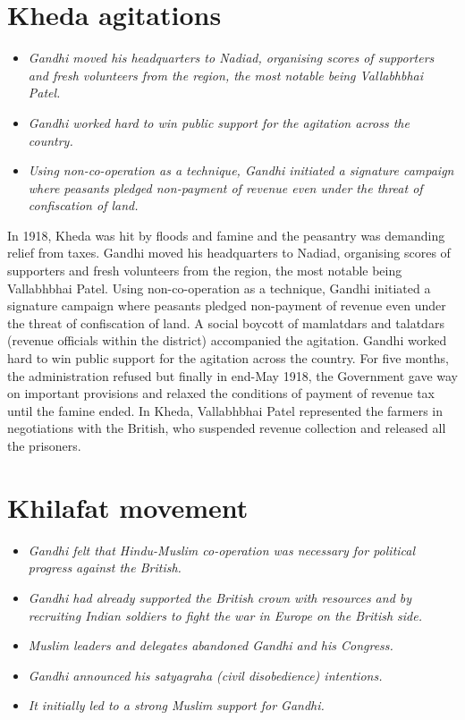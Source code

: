 \section{Kheda agitations}\label{kheda-agitations}

\begin{itemize}
\item
  \emph{Gandhi moved his headquarters to Nadiad, organising scores of
  supporters and fresh volunteers from the region, the most notable
  being Vallabhbhai Patel.}
\item
  \emph{Gandhi worked hard to win public support for the agitation
  across the country.}
\item
  \emph{Using non-co-operation as a technique, Gandhi initiated a
  signature campaign where peasants pledged non-payment of revenue even
  under the threat of confiscation of land.}
\end{itemize}

In 1918, Kheda was hit by floods and famine and the peasantry was
demanding relief from taxes. Gandhi moved his headquarters to Nadiad,
organising scores of supporters and fresh volunteers from the region,
the most notable being Vallabhbhai Patel. Using non-co-operation as a
technique, Gandhi initiated a signature campaign where peasants pledged
non-payment of revenue even under the threat of confiscation of land. A
social boycott of mamlatdars and talatdars (revenue officials within the
district) accompanied the agitation. Gandhi worked hard to win public
support for the agitation across the country. For five months, the
administration refused but finally in end-May 1918, the Government gave
way on important provisions and relaxed the conditions of payment of
revenue tax until the famine ended. In Kheda, Vallabhbhai Patel
represented the farmers in negotiations with the British, who suspended
revenue collection and released all the prisoners.

\section{Khilafat movement}\label{khilafat-movement}

\begin{itemize}
\item
  \emph{Gandhi felt that Hindu-Muslim co-operation was necessary for
  political progress against the British.}
\item
  \emph{Gandhi had already supported the British crown with resources
  and by recruiting Indian soldiers to fight the war in Europe on the
  British side.}
\item
  \emph{Muslim leaders and delegates abandoned Gandhi and his Congress.}
\item
  \emph{Gandhi announced his satyagraha (civil disobedience)
  intentions.}
\item
  \emph{It initially led to a strong Muslim support for Gandhi.}
\end{itemize}

